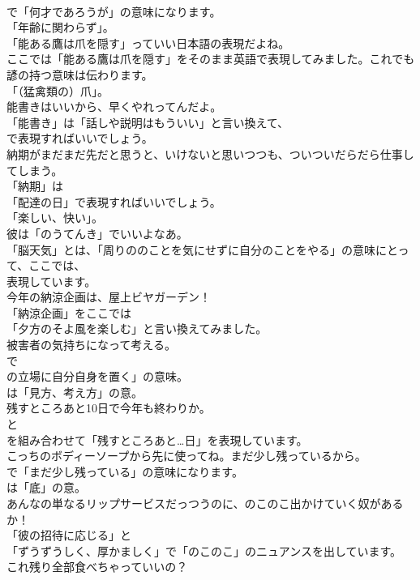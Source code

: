 \documentclass[8pt]{extreport}
\begin{document}
\begin{CJK}{UTF8}{min}
\\	で「何才であろうが」の意味になります。
\\	「年齢に関わらず」。	
\\	「能ある鷹は爪を隠す」っていい日本語の表現だよね。 
\\	ここでは「能ある鷹は爪を隠す」をそのまま英語で表現してみました。これでも諺の持つ意味は伝わります。
\\	「（猛禽類の）爪」。	
\\	能書きはいいから、早くやれってんだよ。 
\\	「能書き」は「話しや説明はもういい」と言い換えて、
\\	で表現すればいいでしょう。	
\\	納期がまだまだ先だと思うと、いけないと思いつつも、ついついだらだら仕事してしまう。 
\\	「納期」は
\\	「配達の日」で表現すればいいでしょう。
\\	「楽しい、快い」。	
\\	彼は「のうてんき」でいいよなあ。 
\\	「脳天気」とは、「周りののことを気にせずに自分のことをやる」の意味にとって、ここでは、
\\	表現しています。	
\\	今年の納涼企画は、屋上ビヤガーデン！ 
\\	「納涼企画」をここでは
\\	「夕方のそよ風を楽しむ」と言い換えてみました。	
\\	被害者の気持ちになって考える。 
\\	で
\\	の立場に自分自身を置く」の意味。
\\	は「見方、考え方」の意。	
\\	残すところあと10日で今年も終わりか。 
\\	と 
\\	を組み合わせて「残すところあと…日」を表現しています。	
\\	こっちのボディーソープから先に使ってね。まだ少し残っているから。 
\\	で「まだ少し残っている」の意味になります。
\\	は「底」の意。	
\\	あんなの単なるリップサービスだっつうのに、のこのこ出かけていく奴があるか！ 
\\	「彼の招待に応じる」と
\\	「ずうずうしく、厚かましく」で「のこのこ」のニュアンスを出しています。	
\\	これ残り全部食べちゃっていいの？ 

\end{CJK}
\end{document}
